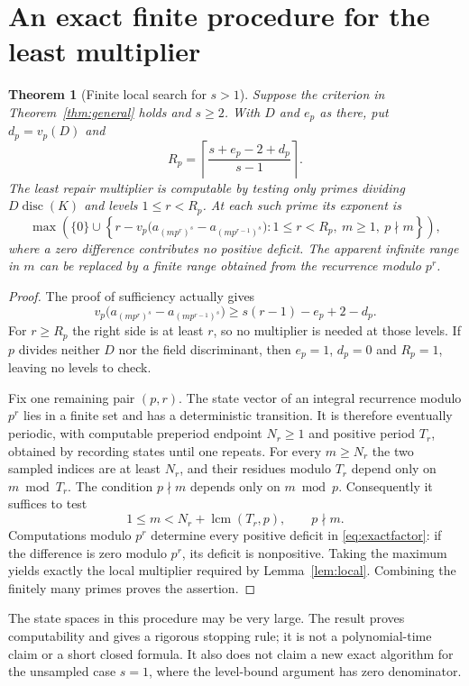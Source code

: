 \documentclass[11pt]{article}
\newtheorem{theorem}{Theorem}
\theoremstyle{definition}
\theoremstyle{remark}
\newcommand{\lcm}{\operatorname{lcm}}
\begin{document}
\section{An exact finite procedure for the least multiplier}
\begin{theorem}[Finite local search for $s>1$]\label{thm:exact}
Suppose the criterion in Theorem~\ref{thm:general} holds and $s\geq2$. With $D$ and $e_p$ as there, put $d_p=v_p(D)$ and
\[
 R_p=\left\lceil\frac{s+e_p-2+d_p}{s-1}\right\rceil.
\]
The least repair multiplier is computable by testing only primes dividing $D\operatorname{disc}(K)$ and levels $1\leq r<R_p$. At each such prime its exponent is
\begin{equation}\label{eq:exactfactor}
 \max\left(\{0\}\cup
 \left\{r-v_p\bigl(a_{(mp^r)^s}-a_{(mp^{r-1})^s}\bigr):
  1\leq r<R_p,\ m\geq1,\ p\nmid m\right\}\right),
\end{equation}
where a zero difference contributes no positive deficit. The apparent infinite range in $m$ can be replaced by a finite range obtained from the recurrence modulo $p^r$.
\end{theorem}
\begin{proof}
The proof of sufficiency actually gives
\[
 v_p\bigl(a_{(mp^r)^s}-a_{(mp^{r-1})^s}\bigr)
 \geq s(r-1)-e_p+2-d_p.
\]
For $r\geq R_p$ the right side is at least $r$, so no multiplier is needed at those levels. If $p$ divides neither $D$ nor the field discriminant, then $e_p=1$, $d_p=0$ and $R_p=1$, leaving no levels to check.

Fix one remaining pair $(p,r)$. The state vector of an integral recurrence modulo $p^r$ lies in a finite set and has a deterministic transition. It is therefore eventually periodic, with computable preperiod endpoint $N_r\geq1$ and positive period $T_r$, obtained by recording states until one repeats. For every $m\geq N_r$ the two sampled indices are at least $N_r$, and their residues modulo $T_r$ depend only on $m\bmod T_r$. The condition $p\nmid m$ depends only on $m\bmod p$. Consequently it suffices to test
\[
 1\leq m<N_r+\lcm(T_r,p),\qquad p\nmid m.
\]
Computations modulo $p^r$ determine every positive deficit in \eqref{eq:exactfactor}: if the difference is zero modulo $p^r$, its deficit is nonpositive. Taking the maximum yields exactly the local multiplier required by Lemma~\ref{lem:local}. Combining the finitely many primes proves the assertion.
\end{proof}

The state spaces in this procedure may be very large. The result proves computability and gives a rigorous stopping rule; it is not a polynomial-time claim or a short closed formula. It also does not claim a new exact algorithm for the unsampled case $s=1$, where the level-bound argument has zero denominator.
\end{document}
